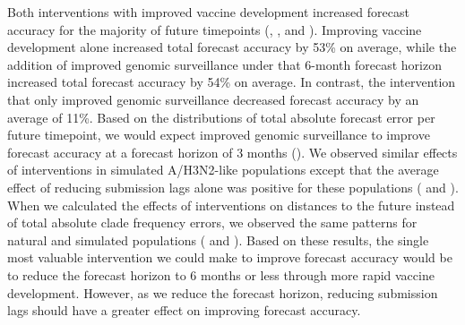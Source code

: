 \documentclass[9pt,lineno]{elife}
\begin{document}
Both interventions with improved vaccine development increased forecast accuracy for the majority of future timepoints (, , and ).
Improving vaccine development alone increased total forecast accuracy by 53\% on average, while the addition of improved genomic surveillance under that 6-month forecast horizon increased total forecast accuracy by 54\% on average.
In contrast, the intervention that only improved genomic surveillance decreased forecast accuracy by an average of 11\%.
Based on the distributions of total absolute forecast error per future timepoint, we would expect improved genomic surveillance to improve forecast accuracy at a forecast horizon of 3 months ().
We observed similar effects of interventions in simulated A/H3N2-like populations except that the average effect of reducing submission lags alone was positive for these populations ( and ).
When we calculated the effects of interventions on distances to the future instead of total absolute clade frequency errors, we observed the same patterns for natural and simulated populations ( and ).
Based on these results, the single most valuable intervention we could make to improve forecast accuracy would be to reduce the forecast horizon to 6 months or less through more rapid vaccine development.
However, as we reduce the forecast horizon, reducing submission lags should have a greater effect on improving forecast accuracy.
\end{document}
